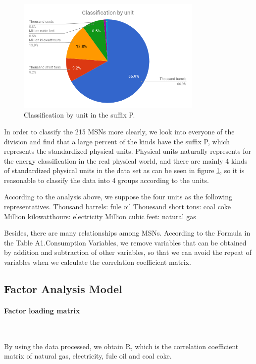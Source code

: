 \documentclass[a4paper,11pt]{article}
\begin{document}
\begin{figure}[!h]%
    \centering 
    \includegraphics[width=0.8\textwidth]{./Pic/classification_by_unit.png}
    \caption{Classification by unit in the suffix P.}
    \label{fig:classification_by_unit}  
\end{figure}

\par In order to classify the 215 MSNs more clearly, we look into everyone of the division and find that a large percent of the kinds have the suffix P, which represents the standardized physical units. Physical units naturally represents for the energy classification in the real physical world, and there are mainly 4 kinds of standardized physical units in the data set as can be seen in figure \ref{fig:classification_by_unit}, so it is reasonable to classify the data into 4 groups according to the units.
\par According to the analysis above, we suppose the four units as the following representatives.
Thousand barrels: fule oil
Thouesand short tons: coal coke
Million kilowatthours: electricity
Million cubic feet: natural gas
\par Besides, there are many relationships among MSNs. According to the Formula in the Table A1.Consumption Variables,\cite{4} we remove variables that can be obtained by addition and subtraction of other variables, so that we can avoid the repeat of variables when we calculate the correlation coefficient matrix. 

\subsection{Factor Analysis Model}

\paragraph{Factor loading matrix}
\textrm{\\}
\par By using the data processed, we obtain R, which is the correlation coefficient matrix of natural gas, electricity, fule oil and coal coke.
\end{document}
